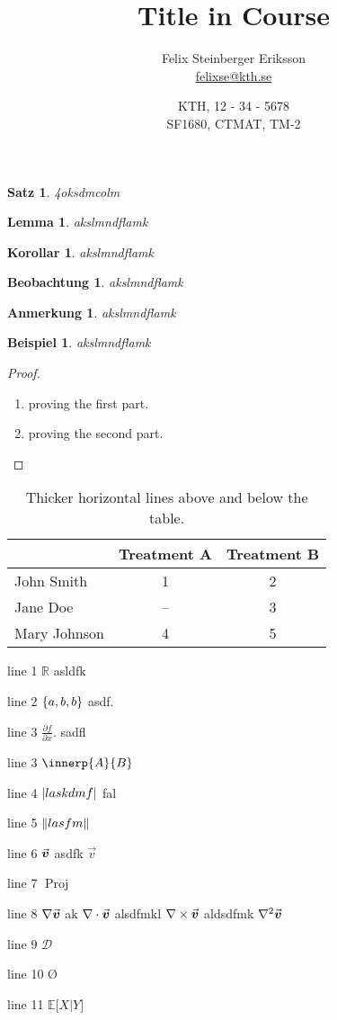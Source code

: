 \documentclass[11pt]{article}
\title{Title in Course}
\author{Felix Steinberger Eriksson\\
	\url{felixse@kth.se}}
\date{KTH, 12 - 34 - 5678\\ %
	SF1680, CTMAT, TM-2}
\newtheorem{thm}{Theorem}
\newtheorem{lem}{Lemma}[thm]
\newtheorem{cor}{Corollary}[thm]
\newtheorem*{defn}{Definition}
\newtheorem*{note}{Note}
\newtheorem*{rem}{Remark}
\newtheorem*{ex}{Example}
\newtheorem{thm}{Sats}
\newtheorem{lem}{Lemma}[thm]
\newtheorem{cor}{Följdsats}[thm]
\newtheorem*{note}{Kommentar}
\newtheorem*{rem}{Anmärkning}
\newtheorem*{ex}{Exempel}
\newtheorem{thm}{Satz}
\newtheorem{lem}{Lemma}[thm]
\newtheorem{cor}{Korollar}[thm]
\newtheorem*{note}{Beobachtung}
\newtheorem*{rem}{Anmerkung}
\newtheorem*{ex}{Beispiel}
\newcommand{\rr}{\mathbb{R}}
\newcommand{\calD}{\mathcal{D}}
\DeclarePairedDelimiter\setof{\{}{\}}
\newcommand{\Proj}{\operatorname{Proj}}
\newcommand{\del}[2]{\frac{\partial #1}{\partial #2}}
\DeclarePairedDelimiter\abs{\lvert}{\rvert}
\DeclarePairedDelimiter\norm{\lVert}{\rVert}
\newcommand{\vv}[1]{\vec{\mkern0mu\bm{#1}}}
\newcommand{\grad}[1]{\nabla #1}
\newcommand{\dv}[1]{\nabla\cdot #1}
\newcommand{\curl}[1]{\nabla\times #1}
\newcommand{\lapl}[1]{\nabla^2 #1}
\renewcommand{\emptyset}{\text{\O}}
\newcommand{\E}[1]{\mathbb{E}{\bigl[#1\bigr]}}
\newcommand{\given}{\big|}
\begin{document}
	\maketitle
	
	\lipsum[1-3]
	\begin{thm}
		4oksdmcolm
	\end{thm}
	\begin{lem}
		akslmndflamk
	\end{lem}
	\begin{cor}
		akslmndflamk
	\end{cor}
	\begin{note}
		akslmndflamk
	\end{note}
	\begin{rem}
		akslmndflamk
	\end{rem}
	\begin{ex}
		akslmndflamk
	\end{ex}
	\begin{proof}
		\    %
		\begin{enumerate}
			\item proving the first part.
			\item proving the second part.
		\end{enumerate}
	\end{proof}
\newpage

\begin{table}[ht]
	\centering
	\caption{Thicker horizontal lines above and below the table.}
	\begin{tabular}[t]{lcc}
		\toprule
		&Treatment A&Treatment B\\
		\midrule
		John Smith&1&2\\
		Jane Doe&--&3\\
		Mary Johnson&4&5\\
		\bottomrule
	\end{tabular}
\end{table}%

line 1 $\rr$ asldfk

line 2 $\setof{a, b,b}$ asdf.

line 3 $\del{f}{x}$. sadfl

line 3 $\innerp{A}{B}$

line 4 $\abs{laskdmf}$ fal 

line 5 $\norm{lasfm}$

line 6 $\vv{v}$ asdfk $\vec{v}$

line 7 $\Proj$ 

line 8 $\grad{\vv{v}}$ ak $\dv{\vv{v}}$ alsdfmkl $\curl{\vv{v}}$ aldsdfmk $\lapl{\vv{v}}$

line 9 $\calD$

line 10 $\emptyset$


line 11 $\E{X \given Y}$
\end{document}
